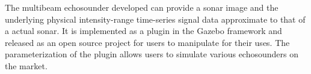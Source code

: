 \documentclass[utf8]{frontiersSCNS} %
\begin{document}
The multibeam echosounder developed can provide a sonar image and the underlying physical intensity-range time-series signal data approximate to that of a actual sonar. It is implemented as a plugin in the Gazebo framework and released as an open source project for users to manipulate for their uses. The parameterization of the plugin allows users to simulate various echosounders on the market.



\end{document}
